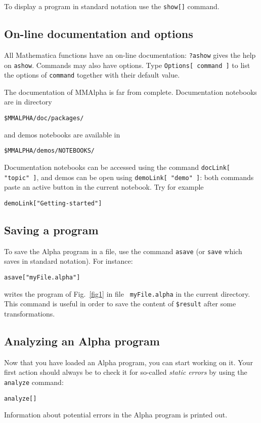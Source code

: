 \documentclass[12pt]{article}
\newcommand{\Alpha}{{\sc Alpha}}
\newcommand{\MMA}{{\sc MMAlpha}}
\newcommand{\MMAlfa}{\MMA}
\newcommand{\mma}{{Mathematica}}
\begin{document}
To display a program in standard notation
use the
\texttt{show[]} command.
\subsection{On-line documentation and options}
All \mma{} functions have an on-line documentation: 
\texttt{?ashow} gives the help on \texttt{ashow}. Commands
may also have options. Type \texttt{Options[ command ]} to list
the options of \texttt{command} together with their default value.

The documentation of \MMAlfa{} is far from complete. 
Documentation notebooks are in directory 
\begin{verbatim}
$MMALPHA/doc/packages/
\end{verbatim}
and demos notebooks are available in 
\begin{verbatim}
$MMALPHA/demos/NOTEBOOKS/
\end{verbatim}
Documentation notebooks can be accessed
using the command \texttt{docLink[ "topic" ]}, and demos
can be open using \texttt{demoLink[ "demo" ]}: both commands
paste an active button in the current notebook. Try 
for example 
\begin{verbatim}
demoLink["Getting-started"]
\end{verbatim}

\subsection{Saving a program}
To save the {\Alpha} program in a file, use
the command {\tt asave} (or {\tt save} which saves in standard
notation). For instance: 
\begin{verbatim}
asave["myFile.alpha"]
\end{verbatim}
writes the program of Fig.~\ref{fig1} in file {\tt
myFile.alpha} in the current directory. 
This command is useful in order to save
the content of \texttt{\$result} after some transformations. 

\subsection{Analyzing an {\Alpha} program}
\label{analyzing}
Now that you have loaded an {\Alpha} program, you can start working on
it. Your first action should always be to check it for so-called {\em static
errors} by using the {\tt analyze} command:
\begin{verbatim}
analyze[]
\end{verbatim}
Information about potential errors in the {\Alpha} program
is printed out. 
\end{document}
